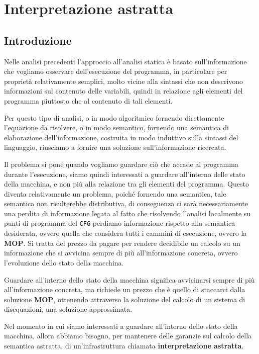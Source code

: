 \chapter{Interpretazione astratta}
\section{Introduzione}
Nelle analisi precedenti l'approccio all'analisi statica è basato sull'informazione che
vogliamo osservare dell'esecuzione del programma, in particolare per proprietà relativamente semplici,
molto vicine alla sintassi che non descrivono informazioni sul contenuto delle variabili,
quindi in relazione agli elementi del programma piuttosto che al contenuto di tali elementi.

Per questo tipo di analisi, o in modo algoritmico fornendo direttamente l'equazione da risolvere, o 
in modo semantico, fornendo una semantica di elaborazione dell'informazione, costruita 
in modo induttivo sulla sintassi del linguaggio, riusciamo a fornire una soluzione sull'informazione
ricercata.

Il problema si pone quando vogliamo guardare ciò che accade al programma durante l'esecuzione, 
siamo quindi interessati a guardare all'interno delle stato della macchina, e non più alla relazione 
tra gli elementi del programma. Questo diventa relativamente un problema, poiché fornendo una 
semantica, tale semantica non risulterebbe distributiva, di conseguenza ci sarà necessariamente 
una perdita di informazione legata al fatto che risolvendo l'analisi localmente su punti di programma 
del \texttt{CFG} perdiamo informazione rispetto alla semantica desiderata, ovvero quella che considera 
tutti i cammini di esecuzione, ovvero la \textbf{MOP}. Si tratta del prezzo da pagare per rendere 
decidibile un calcolo su un informazione che si avvicina sempre di più all'informazione concreta, ovvero 
l'evoluzione dello stato della macchina.

Guardare all'interno dello stato della macchina significa avvicinarsi sempre di più 
all'informazione concreta, ma richiede un prezzo che è quello di staccarci 
dalla soluzione \textbf{MOP}, ottenendo attraverso la soluzione del calcolo 
di un sistema di disequazioni, una soluzione approssimata.

Nel momento in cui siamo interessati a guardare all'interno dello stato della macchina,
allora abbiamo bisogno, per mantenere delle garanzie sul calcolo della semantica astratta, 
di un'infrastruttura chiamata \textbf{interpretazione astratta}.

